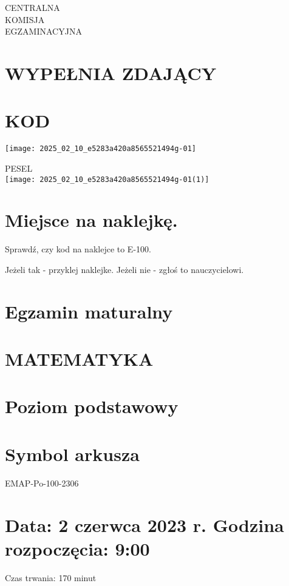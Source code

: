 \documentclass[10pt]{article}
\author{LiczBa punktów do uzyskania: 46}
\date{}
\begin{document}
\maketitle
CENTRALNA\\
KOMISJA\\
EGZAMINACYJNA

\section*{WYPEŁNIA ZDAJĄCY}
\section*{KOD}
\begin{center}
\texttt{[image: 2025\_02\_10\_e5283a420a8565521494g-01]}
\end{center}

PESEL\\
\texttt{[image: 2025\_02\_10\_e5283a420a8565521494g-01(1)]}

\section*{Miejsce na naklejkę.}
Sprawdź, czy kod na naklejce to E-100.

Jeżeli tak - przyklej naklejke. Jeżeli nie - zgłoś to nauczycielowi.

\section*{Egzamin maturalny}
\section*{MATEMATYKA}
\section*{Poziom podstawowy}
\section*{Symbol arkusza}
EMAP-Po-100-2306

\section*{Data: 2 czerwca 2023 r. Godzina rozpoczęcia: 9:00}
 Czas trwania: 170 minut
\end{document}
